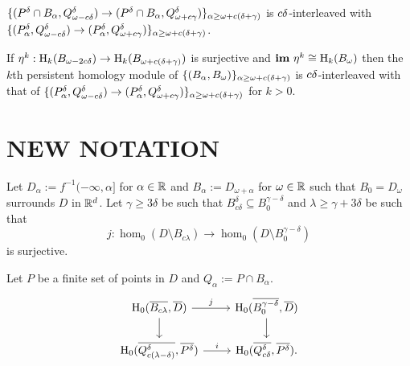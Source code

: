 \begin{lemma}
  $\{(P^{{\delta}}\cap B_\alpha, Q_{\omega - c{\delta}}^{\delta})\to (P^{{\delta}}\cap B_\alpha, Q_{\omega + c{\gamma}}^{\delta})\}_{\alpha\geq\omega + c({\delta} + {\gamma})}$ is $c{\delta}$-interleaved with $\{(P_\alpha^{\delta}, Q_{\omega - c{\delta}}^{\delta})\to (P_\alpha^{\delta}, Q_{\omega + c{\gamma}}^{\delta})\}_{\alpha\geq\omega + c({\delta} + {\gamma})}$.
\end{lemma}

\begin{corollary}
  If $\eta^k : \mathrm{H}_k(B_{\omega - 2c{\delta}})\to \mathrm{H}_k(B_{\omega + c({\delta} + {\gamma})})$ is surjective and $\mathbf{im}~\eta^k\cong \mathrm{H}_k(B_\omega)$ then the $k$th persistent homology module of $\{(B_\alpha, B_\omega)\}_{\alpha\geq\omega + c({\delta} + {\gamma})}$ is $c{\delta}$-interleaved with that of $\{(P_\alpha^{\delta}, Q_{\omega - c{\delta}}^{\delta})\to (P_\alpha^{\delta}, Q_{\omega + c{\gamma}}^{\delta})\}_{\alpha\geq\omega + c({\delta} + {\gamma})}$ for $k > 0$.
\end{corollary}

\section{NEW NOTATION}

Let $D_\alpha := f^{-1}(-\infty, \alpha]$ for $\alpha\in\mathbb{R}$ and $B_\alpha := D_{\omega+\alpha}$ for $\omega\in\mathbb{R}$ such that $B_0 = D_\omega$ surrounds $D$ in $\mathbb{R}^d$.
Let $\gamma\geq 3\delta$ be such that $B_{c\delta}^\delta\subseteq B_0^{\gamma-\delta}$ and $\lambda \geq \gamma + 3\delta$ be such that
\[j : \hom_0(D\setminus B_{c\lambda})\to \hom_0(D\setminus B_0^{\gamma - \delta}) \]
is surjective.

Let $P$ be a finite set of points in $D$ and $Q_\alpha := P\cap B_\alpha$.
\begin{equation}\label{dgm:1}\begin{tikzcd}
  \hom_0(\cmp{B_{c\lambda}}, \cmp{D})\arrow{d} \arrow{r}{j} & %
  \hom_0(\cmp{B_0^{\gamma - \delta}},\cmp{D}) \arrow{d} \\
  \hom_0(\cmp{Q_{c(\lambda - \delta)}^\of}, \cmp{\P}) \arrow{r}{i} & %
  \hom_0(\cmp{Q_{c\delta}^\of}, \cmp{\P}).
\end{tikzcd}\end{equation}
